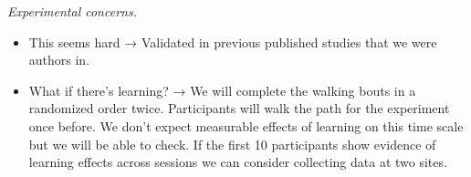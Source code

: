 \emph{Experimental concerns.}

\begin{itemize}
\item
  This seems hard → Validated in previous published studies that we were
  authors in.
\item
  What if there's learning? → We will complete the walking bouts in a
  randomized order twice. Participants will walk the path for the
  experiment once before. We don't expect measurable effects of learning
  on this time scale but we will be able to check. If the first 10
  participants show evidence of learning effects across sessions we can
  consider collecting data at two sites.
\end{itemize}
